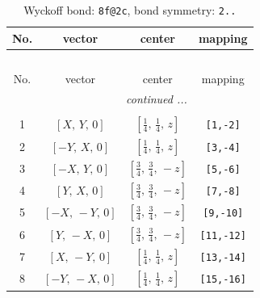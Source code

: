 \documentclass[fleqn,8pt]{jsarticle}
\begin{document}
\begin{longtable}{cccc}
\caption{Wyckoff bond: {\tt 8f@2c}, bond symmetry: {\tt 2..}}
 \\
 \hline \hline
No. & vector & center & mapping \\ \hline \endfirsthead

\multicolumn{3}{l}{\tablename\ \thetable{}} \\
 \hline \hline
No. & vector & center & mapping \\ \hline \endhead

 \hline \hline
\multicolumn{3}{r}{\footnotesize\it continued ...} \\ \endfoot

 \hline \hline
\multicolumn{3}{r}{} \\ \endlastfoot

1 & $\left[ X,\, Y,\, 0 \right]$ & $\left[ \frac{1}{4},\, \frac{1}{4},\, z \right]$ & {\tt [1,-2]} \\ \hline
2 & $\left[ - Y,\, X,\, 0 \right]$ & $\left[ \frac{1}{4},\, \frac{1}{4},\, z \right]$ & {\tt [3,-4]} \\ \hline
3 & $\left[ - X,\, Y,\, 0 \right]$ & $\left[ \frac{3}{4},\, \frac{3}{4},\, - z \right]$ & {\tt [5,-6]} \\ \hline
4 & $\left[ Y,\, X,\, 0 \right]$ & $\left[ \frac{3}{4},\, \frac{3}{4},\, - z \right]$ & {\tt [7,-8]} \\ \hline
5 & $\left[ - X,\, - Y,\, 0 \right]$ & $\left[ \frac{3}{4},\, \frac{3}{4},\, - z \right]$ & {\tt [9,-10]} \\ \hline
6 & $\left[ Y,\, - X,\, 0 \right]$ & $\left[ \frac{3}{4},\, \frac{3}{4},\, - z \right]$ & {\tt [11,-12]} \\ \hline
7 & $\left[ X,\, - Y,\, 0 \right]$ & $\left[ \frac{1}{4},\, \frac{1}{4},\, z \right]$ & {\tt [13,-14]} \\ \hline
8 & $\left[ - Y,\, - X,\, 0 \right]$ & $\left[ \frac{1}{4},\, \frac{1}{4},\, z \right]$ & {\tt [15,-16]} \\
\end{longtable}
\renewcommand{\arraystretch}{1.2}
\end{document}
